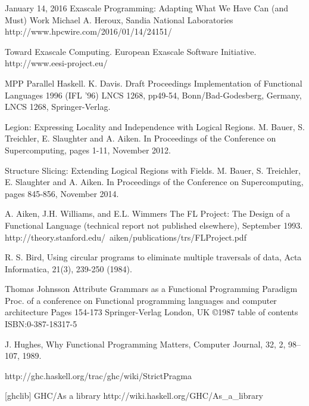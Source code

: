 \documentclass{llncs}
\begin{document}
%
%
\begin{thebibliography}{5}

January 14, 2016
Exascale Programming: Adapting What We Have Can (and Must) Work
Michael A. Heroux, Sandia National Laboratories
http://www.hpcwire.com/2016/01/14/24151/

Toward Exascale Computing.
European Exascale Software Initiative.
http://www.eesi-project.eu/

MPP Parallel Haskell. 
K. Davis. 
Draft Proceedings Implementation of Functional Languages 1996 (IFL '96) LNCS
1268, pp49-54, Bonn/Bad-Godesberg, Germany, LNCS 1268, Springer-Verlag.

Legion: Expressing Locality and Independence with Logical
  Regions. M. Bauer, S. Treichler, E. Slaughter and A. Aiken. In Proceedings
  of the Conference on Supercomputing, pages 1-11, November 2012.

Structure Slicing: Extending Logical Regions with Fields. M. Bauer, S. Treichler, E. Slaughter and A. Aiken. In Proceedings of the Conference on Supercomputing, pages 845-856, November 2014.

A. Aiken, J.H. Williams, and E.L. Wimmers
The FL Project:  The Design of a Functional Language
(technical report not published elsewhere), September 1993.
http://theory.stanford.edu/~aiken/publications/trs/FLProject.pdf

R. S. Bird, 
Using circular programs to eliminate multiple traversals of data, 
Acta Informatica, 21(3), 239-250 (1984).

Thomas Johnsson
Attribute Grammars as a Functional Programming Paradigm
Proc. of a conference on Functional programming languages and computer architecture
Pages 154-173 
Springer-Verlag London, UK ©1987 
table of contents ISBN:0-387-18317-5

J. Hughes,
Why Functional Programming Matters,
Computer Journal,
32,
2,
98--107,
1989.

http://ghc.haskell.org/trac/ghc/wiki/StrictPragma

[ghclib] GHC/As a library http://wiki.haskell.org/GHC/As\_a\_library

\end{thebibliography}
\end{document}
